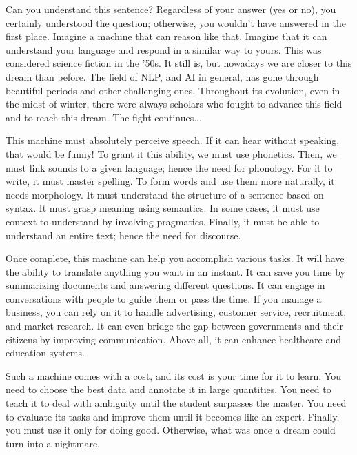 \documentclass{KBook}
\begin{document}
\begin{discussion}
	
	Can you understand this sentence? Regardless of your answer (yes or no), you certainly understood the question; otherwise, you wouldn't have answered in the first place. Imagine a machine that can reason like that. Imagine that it can understand your language and respond in a similar way to yours. This was considered science fiction in the '50s. It still is, but nowadays we are closer to this dream than before. The field of NLP, and AI in general, has gone through beautiful periods and other challenging ones. Throughout its evolution, even in the midst of winter, there were always scholars who fought to advance this field and to reach this dream. The fight continues...
	
	This machine must absolutely perceive speech. If it can hear without speaking, that would be funny! To grant it this ability, we must use phonetics. Then, we must link sounds to a given language; hence the need for phonology. For it to write, it must master spelling. To form words and use them more naturally, it needs morphology. It must understand the structure of a sentence based on syntax. It must grasp meaning using semantics. In some cases, it must use context to understand by involving pragmatics. Finally, it must be able to understand an entire text; hence the need for discourse.
	
	Once complete, this machine can help you accomplish various tasks. It will have the ability to translate anything you want in an instant. It can save you time by summarizing documents and answering different questions. It can engage in conversations with people to guide them or pass the time. If you manage a business, you can rely on it to handle advertising, customer service, recruitment, and market research. It can even bridge the gap between governments and their citizens by improving communication. Above all, it can enhance healthcare and education systems.
	
	Such a machine comes with a cost, and its cost is your time for it to learn. You need to choose the best data and annotate it in large quantities. You need to teach it to deal with ambiguity until the student surpasses the master. You need to evaluate its tasks and improve them until it becomes like an expert. Finally, you must use it only for doing good. Otherwise, what was once a dream could turn into a nightmare.
	
\end{discussion}


\ifx\wholebook\relax\else
% 
% 
	
\end{document}
